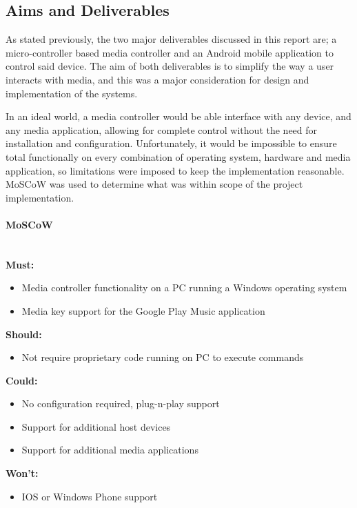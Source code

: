 \documentclass{article}
\begin{document}
		\subsection{Aims and Deliverables}
			As stated previously, the two major deliverables discussed in this report are; a micro-controller based media controller and an Android mobile application to control said device. The aim of both deliverables is to simplify the way a user interacts with media, and this was a major consideration for design and implementation of the systems.
			
			In an ideal world, a media controller would be able interface with any device, and any media application, allowing for complete control without the need for installation and configuration. Unfortunately, it would be impossible to ensure total functionally on every combination of operating system, hardware and media application, so limitations were imposed to keep the implementation reasonable.
			MoSCoW was used to determine what was within scope of the project implementation.

			\paragraph{MoSCoW}\label{MoSCoW}
				\noindent\\
				\textbf{Must:}
					\begin{itemize}
						\item Media controller functionality on a PC running a Windows operating system
						\item Media key support for the Google Play Music application
					\end{itemize}			
				\textbf{Should:}
					\begin{itemize}
						\item Not require proprietary code running on PC to execute commands
					\end{itemize}
				\textbf{Could:}
					\begin{itemize}
						\item No configuration required, plug-n-play support
						\item Support for additional host devices
						\item Support for additional media applications
					\end{itemize}
				\textbf{Won't:}
					\begin{itemize}
						\item IOS or Windows Phone support
					\end{itemize}
			
\end{document}
